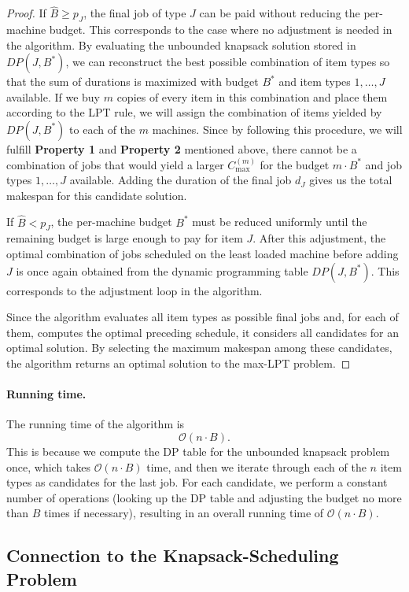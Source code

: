 \begin{proof}
If $\hat{B} \ge p_J$, the final job of type $J$ can be paid without reducing the per-machine budget. This corresponds to the case where no adjustment is needed in the algorithm.
By evaluating the unbounded knapsack solution stored in $DP(J, B^*)$, we can reconstruct the best possible combination of item types so that the sum of durations is maximized with budget $B^*$ and item types $1, \ldots, J$ available.
If we buy $m$ copies of every item in this combination and place them according to the LPT rule, we will assign the combination of items yielded by $DP(J, B^*)$ to each of the $m$ machines. Since by following this procedure, we will fulfill \textbf{Property 1} and \textbf{Property 2} mentioned above, there cannot be a combination of jobs that would yield a larger $C_{\max}^{(m)}$ for the budget $m \cdot B^*$ and job types $1, \ldots, J$ available. 
 Adding the duration of the final job $d_J$ gives us the total makespan for this candidate solution.

If $\hat{B} < p_J$, the per-machine budget $B^*$ must be reduced uniformly until the remaining budget is large enough to pay for item $J$. After this adjustment, the optimal combination of jobs scheduled on the least loaded machine before adding $J$ is once again obtained from the dynamic programming table $DP(J, B^*)$. This corresponds to the adjustment loop in the algorithm.

Since the algorithm evaluates all item types as possible final jobs and, for each of them, computes the optimal preceding schedule, it considers all candidates for an optimal solution. By selecting the maximum makespan among these candidates, the algorithm returns an optimal solution to the max-LPT problem.
\end{proof}

\paragraph{Running time.}
The running time of the algorithm is
\[
\mathcal{O}(n \cdot B).
\]
This is because we compute the DP table for the unbounded knapsack problem once, which takes $\mathcal{O}(n \cdot B)$ time, 
and then we iterate through each of the $n$ item types as candidates for the last job. 
For each candidate, we perform a constant number of operations (looking up the DP table and adjusting the budget no more than $B$ times if necessary), resulting in an overall running time of $\mathcal{O}(n \cdot B)$.

\subsection{Connection to the Knapsack-Scheduling Problem}

